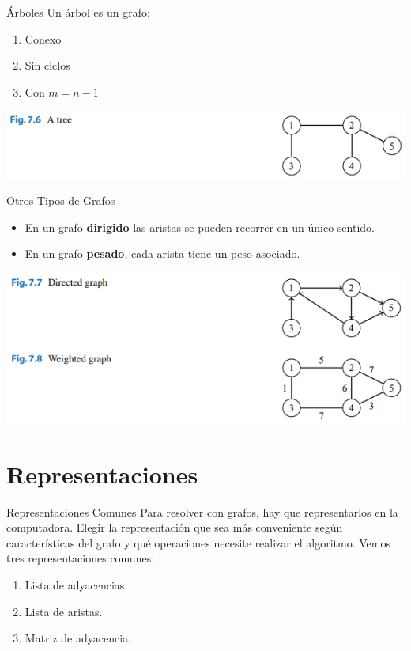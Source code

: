 \documentclass{beamer}
\begin{document}
\begin{frame}{Árboles}
	Un árbol es un grafo:
	\begin{enumerate}
		\item Conexo
		\item Sin ciclos
		\item Con $m = n-1$
	\end{enumerate}
	\begin{center}
		\includegraphics[]{figuras/7.6-arbol.PNG}
	\end{center}
\end{frame}

\begin{frame}{Otros Tipos de Grafos}
	\begin{itemize}
		\item En un grafo \textbf{dirigido} las aristas se pueden recorrer en un único sentido.
		\item En un grafo \textbf{pesado}, cada arista tiene un peso asociado.
	\end{itemize}
	\begin{center}
		\includegraphics[]{figuras/7.7-dirigido-pesado.PNG}
	\end{center}
\end{frame}


\section{Representaciones}

\begin{frame}{Representaciones Comunes}
	Para resolver con grafos, hay que representarlos en la computadora. Elegir la representación que sea más conveniente según características del grafo y qué operaciones necesite realizar el algoritmo. Vemos tres representaciones comunes:
	\begin{enumerate}
		\item Lista de adyacencias.
		\item Lista de aristas.
		\item Matriz de adyacencia.
	\end{enumerate}
\end{frame}
\end{document}
